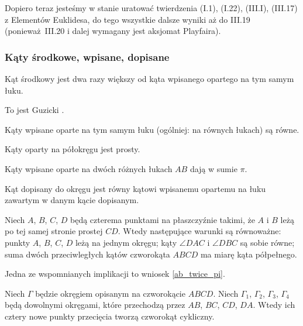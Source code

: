 Dopiero teraz jesteśmy w stanie uratować twierdzenia (I.1), (I.22), (III.I), (III.17) z Elementów Euklidesa, do tego wszystkie dalsze wyniki aż do III.19 (ponieważ III.20 i dalej wymagany jest aksjomat Playfaira).

\subsubsection{Kąty środkowe, wpisane, dopisane}

\begin{proposition}
    Kąt środkowy jest dwa razy większy od kąta wpisanego opartego na tym samym łuku.
\end{proposition}
To jest Guzicki \cite[s. 11]{guzicki_2021}.

\begin{corollary}
    Kąty wpisane oparte na tym samym łuku (ogólniej: na równych łukach) są równe.
\end{corollary}

\begin{corollary}
    Kąty oparty na półokręgu jest prosty.
\end{corollary}

\begin{corollary}
    \label{ab_twice_pi}
    Kąty wpisane oparte na dwóch różnych łukach $AB$ dają w sumie $\pi$.
\end{corollary}

\begin{proposition}
    Kąt dopisany do okręgu jest równy kątowi wpisanemu opartemu na łuku zawartym w danym kącie dopisanym.
\end{proposition}

\begin{proposition}
	Niech $A$, $B$, $C$, $D$ będą czterema punktami na płaszczyźnie takimi, że $A$ i $B$ leżą po tej samej stronie prostej $CD$.
	Wtedy następujące warunki są równoważne: punkty $A$, $B$, $C$, $D$ leżą na jednym okręgu; kąty $\angle DAC$ i $\angle DBC$ są sobie równe; suma dwóch przeciwległych kątów czworokąta $ABCD$ ma miarę kąta półpełnego.
\end{proposition}

Jedna ze wspomnianych implikacji to wniosek \ref{ab_twice_pi}.

\begin{proposition}
	Niech $\Gamma$ będzie okręgiem opisanym na czworokącie $ABCD$.
	Niech $\Gamma_1$, $\Gamma_2$, $\Gamma_3$, $\Gamma_4$ będą dowolnymi okręgami, które przechodzą przez $AB$, $BC$, $CD$, $DA$.
	Wtedy ich cztery nowe punkty przecięcia tworzą czworokąt cykliczny.
\end{proposition}

